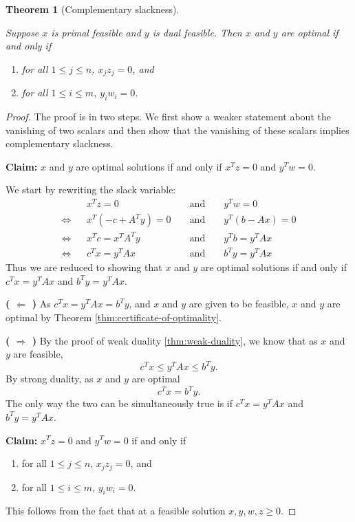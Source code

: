 \documentclass[
]{book}
\providecommand{\tightlist}{%
  \setlength{\itemsep}{0pt}\setlength{\parskip}{0pt}}
\newtheorem{theorem}{Theorem}[chapter]
\theoremstyle{definition}
\theoremstyle{definition}
\theoremstyle{definition}
\theoremstyle{definition}
\theoremstyle{remark}
\begin{document}
\begin{theorem}[Complementary slackness]
\protect\hypertarget{thm:complementary-slackness}{}\label{thm:complementary-slackness}

Suppose \(x\) is primal feasible and \(y\) is dual feasible. Then \(x\) and \(y\) are optimal if and only if

\begin{enumerate}
\def\labelenumi{\arabic{enumi}.}
\tightlist
\item
  for all \(1 \le j \le n\), \(x_j z_j = 0\), and
\item
  for all \(1 \le i \le m\), \(y_i w_i = 0\).
\end{enumerate}

\end{theorem}

\begin{proof}
The proof is in two steps. We first show a weaker statement about the vanishing of two scalars and then show that the vanishing of these scalars implies complementary slackness.

\textbf{Claim:} \(x\) and \(y\) are optimal solutions if and only if \(x^T z = 0\) and \(y^T w = 0\).

We start by rewriting the slack variable:
\begin{align*}
    && x^T z = 0 && \mbox{ and } && y^T w = 0 \\ 
  \Leftrightarrow 
  && x^T (-c + A^T y) = 0 && \mbox{ and } && y^T (b - A x) = 0 \\ 
  \Leftrightarrow 
  && x^T c = x^T A^T y && \mbox{ and } && y^T b = y^T A x \\ 
  \Leftrightarrow 
  && c^T x = y^T A x && \mbox{ and } && b^T y = y^T A x
\end{align*}
Thus we are reduced to showing that \(x\) and \(y\) are optimal solutions if and only if \(c^T x = y^T A x\) and \(b^T y = y^T A x\).

\textbf{( \(\Leftarrow\) )}
As \(c^T x = y^T A x = b^T y\), and \(x\) and \(y\) are given to be feasible, \(x\) and \(y\) are optimal by Theorem \ref{thm:certificate-of-optimality}.

\textbf{( \(\Rightarrow\) )}
By the proof of weak duality \ref{thm:weak-duality}, we know that as \(x\) and \(y\) are feasible,
\[c^T x \le y^T A x \le b^T y.\]
By strong duality, as \(x\) and \(y\) are optimal
\[c^T x = b^T y.\]
The only way the two can be simultaneously true is if \(c^T x = y^T A x\) and \(b^T y = y^T A x\).

\textbf{Claim:} \(x^T z = 0\) and \(y^T w = 0\) if and only if

\begin{enumerate}
\def\labelenumi{\arabic{enumi}.}
\tightlist
\item
  for all \(1 \le j \le n\), \(x_j z_j = 0\), and
\item
  for all \(1 \le i \le m\), \(y_i w_i = 0\).
\end{enumerate}

This follows from the fact that at a feasible solution \(x, y, w, z \ge 0\).
\end{proof}
\end{document}
